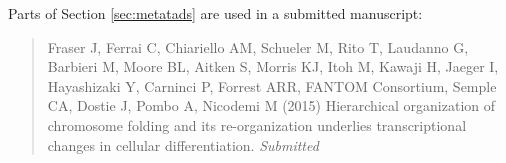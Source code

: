 \documentclass[a4paper,11pt,twoside]{scrbook}
\begin{document}
{\flushleft Parts of Section \ref{sec:metatads} are used in a submitted manuscript:}

\begin{quote}
Fraser J, Ferrai C, Chiariello AM, Schueler M, Rito T, Laudanno G, Barbieri M, Moore BL, Aitken S,
Morris KJ, Itoh M, Kawaji H, Jaeger I, Hayashizaki Y, Carninci P, Forrest ARR, FANTOM Consortium, Semple CA, Dostie J, Pombo A, Nicodemi M (2015) Hierarchical organization
of chromosome folding and its re-organization underlies transcriptional
changes in cellular differentiation. \emph{Submitted}
\end{quote}

\clearpage

\mainmatter











%





\backmatter




\end{document}
